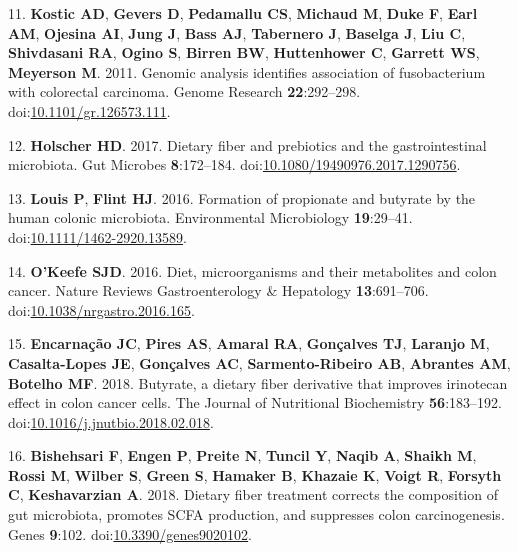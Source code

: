 \documentclass[11pt,]{article}
\begin{document}
\hypertarget{ref-Kostic2011}{}
11. \textbf{Kostic AD}, \textbf{Gevers D}, \textbf{Pedamallu CS},
\textbf{Michaud M}, \textbf{Duke F}, \textbf{Earl AM}, \textbf{Ojesina
AI}, \textbf{Jung J}, \textbf{Bass AJ}, \textbf{Tabernero J},
\textbf{Baselga J}, \textbf{Liu C}, \textbf{Shivdasani RA},
\textbf{Ogino S}, \textbf{Birren BW}, \textbf{Huttenhower C},
\textbf{Garrett WS}, \textbf{Meyerson M}. 2011. Genomic analysis
identifies association of fusobacterium with colorectal carcinoma.
Genome Research \textbf{22}:292--298.
doi:\href{https://doi.org/10.1101/gr.126573.111}{10.1101/gr.126573.111}.

\hypertarget{ref-Holscher2017}{}
12. \textbf{Holscher HD}. 2017. Dietary fiber and prebiotics and the
gastrointestinal microbiota. Gut Microbes \textbf{8}:172--184.
doi:\href{https://doi.org/10.1080/19490976.2017.1290756}{10.1080/19490976.2017.1290756}.

\hypertarget{ref-Louis2016}{}
13. \textbf{Louis P}, \textbf{Flint HJ}. 2016. Formation of propionate
and butyrate by the human colonic microbiota. Environmental Microbiology
\textbf{19}:29--41.
doi:\href{https://doi.org/10.1111/1462-2920.13589}{10.1111/1462-2920.13589}.

\hypertarget{ref-test_OKeefe2016}{}
14. \textbf{O'Keefe SJD}. 2016. Diet, microorganisms and their
metabolites and colon cancer. Nature Reviews Gastroenterology \&
Hepatology \textbf{13}:691--706.
doi:\href{https://doi.org/10.1038/nrgastro.2016.165}{10.1038/nrgastro.2016.165}.

\hypertarget{ref-Encarnao2018}{}
15. \textbf{Encarnação JC}, \textbf{Pires AS}, \textbf{Amaral RA},
\textbf{Gonçalves TJ}, \textbf{Laranjo M}, \textbf{Casalta-Lopes JE},
\textbf{Gonçalves AC}, \textbf{Sarmento-Ribeiro AB}, \textbf{Abrantes
AM}, \textbf{Botelho MF}. 2018. Butyrate, a dietary fiber derivative
that improves irinotecan effect in colon cancer cells. The Journal of
Nutritional Biochemistry \textbf{56}:183--192.
doi:\href{https://doi.org/10.1016/j.jnutbio.2018.02.018}{10.1016/j.jnutbio.2018.02.018}.

\hypertarget{ref-Bishehsari2018}{}
16. \textbf{Bishehsari F}, \textbf{Engen P}, \textbf{Preite N},
\textbf{Tuncil Y}, \textbf{Naqib A}, \textbf{Shaikh M}, \textbf{Rossi
M}, \textbf{Wilber S}, \textbf{Green S}, \textbf{Hamaker B},
\textbf{Khazaie K}, \textbf{Voigt R}, \textbf{Forsyth C},
\textbf{Keshavarzian A}. 2018. Dietary fiber treatment corrects the
composition of gut microbiota, promotes SCFA production, and suppresses
colon carcinogenesis. Genes \textbf{9}:102.
doi:\href{https://doi.org/10.3390/genes9020102}{10.3390/genes9020102}.
\end{document}
